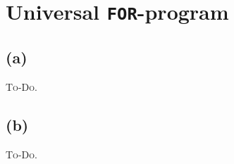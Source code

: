 



\section{Universal \lstinline|FOR|-program}

\subsection{(a)}
\textsc{To-Do.}

\subsection{(b)}
\textsc{To-Do.}


